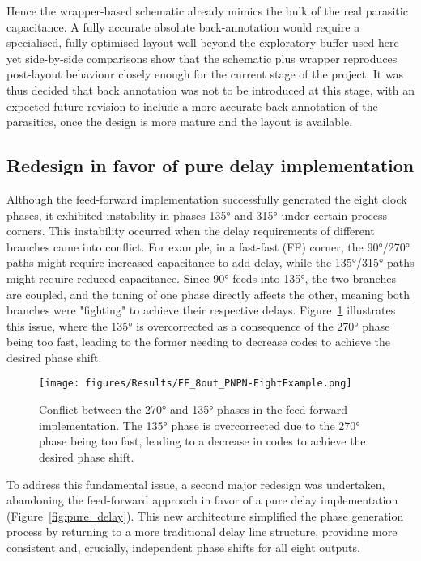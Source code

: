 Hence the wrapper-based schematic already mimics the bulk of the real parasitic capacitance.  
A fully accurate absolute back-annotation would require a specialised, fully optimised layout well beyond the exploratory buffer used here yet side-by-side comparisons show that the schematic plus wrapper reproduces post-layout behaviour closely enough for the current stage of the project.
It was thus decided that back annotation was not to be introduced at this stage, with an expected future revision to include a more accurate back-annotation of the parasitics, once the design is more mature and the layout is available.

\subsection{Redesign in favor of pure delay implementation}\label{sec:second_redesign}

Although the feed-forward implementation successfully generated the eight clock phases, it exhibited instability in phases \ang{135} and \ang{315} under certain process corners. This instability occurred when the delay requirements of different branches came into conflict. For example, in a fast-fast (FF) corner, the \ang{90}/\ang{270} paths might require increased capacitance to add delay, while the \ang{135}/\ang{315} paths might require reduced capacitance. Since \ang{90} feeds into \ang{135}, the two branches are coupled, and the tuning of one phase directly affects the other, meaning both branches were "fighting" to achieve their respective delays. Figure~\ref{fig:FF_8out_225vs135} illustrates this issue, where the \ang{135} is overcorrected as a consequence of the \ang{270} phase being too fast, leading to the former needing to decrease codes to achieve the desired phase shift.

\begin{figure}[h]
  \centering
  \texttt{[image: figures/Results/FF\_8out\_PNPN-FightExample.png]}
  \caption{Conflict between the \ang{270} and \ang{135} phases in the feed-forward implementation. The \ang{135} phase is overcorrected due to the \ang{270} phase being too fast, leading to a decrease in codes to achieve the desired phase shift.}
  \label{fig:FF_8out_225vs135}
\end{figure}

To address this fundamental issue, a second major redesign was undertaken, abandoning the feed-forward approach in favor of a pure delay implementation (Figure~\ref{fig:pure_delay}). This new architecture simplified the phase generation process by returning to a more traditional delay line structure, providing more consistent and, crucially, independent phase shifts for all eight outputs.

